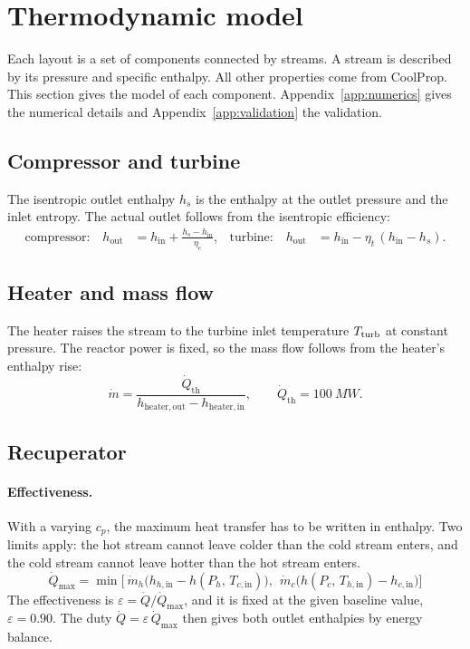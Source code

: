 \section{Thermodynamic model}\label{sec:model}

Each layout is a set of components connected by streams. A stream is described by its pressure and specific enthalpy. All other properties come from CoolProp. This section gives the model of each component. Appendix~\ref{app:numerics} gives the numerical details and Appendix~\ref{app:validation} the validation.

\subsection{Compressor and turbine}
The isentropic outlet enthalpy $h_s$ is the enthalpy at the outlet pressure and the inlet entropy. The actual outlet follows from the isentropic efficiency:
\begin{align}
\text{compressor:}\quad h_\mathrm{out} &= h_\mathrm{in} + \frac{h_s - h_\mathrm{in}}{\eta_c}, &
\text{turbine:}\quad h_\mathrm{out} &= h_\mathrm{in} - \eta_t\,(h_\mathrm{in} - h_s).
\end{align}


\subsection{Heater and mass flow}
The heater raises the stream to the turbine inlet temperature $T_\mathrm{turb}$ at constant pressure. The reactor power is fixed, so the mass flow follows from the heater's enthalpy rise:
\begin{equation}
\dot m = \frac{\dot Q_\mathrm{th}}{h_\mathrm{heater,out} - h_\mathrm{heater,in}}, \qquad \dot Q_\mathrm{th} = \SI{100}{MW}.
\end{equation}


\subsection{Recuperator}\label{sec:recup}
\paragraph{Effectiveness.} With a varying $c_p$, the maximum heat transfer has to be written in enthalpy. Two limits apply: the hot stream cannot leave colder than the cold stream enters, and the cold stream cannot leave hotter than the hot stream enters.
\begin{equation}
\dot Q_\mathrm{max} = \min\Big[\ \dot m_h\big(h_{h,\mathrm{in}} - h(P_h,\,T_{c,\mathrm{in}})\big),\ \ \dot m_c\big(h(P_c,\,T_{h,\mathrm{in}}) - h_{c,\mathrm{in}}\big)\Big]
\end{equation}
The effectiveness is $\varepsilon = \dot Q/\dot Q_\mathrm{max}$, and it is fixed at the given baseline value, $\varepsilon = 0.90$. The duty $\dot Q = \varepsilon\,\dot Q_\mathrm{max}$ then gives both outlet enthalpies by energy balance.

